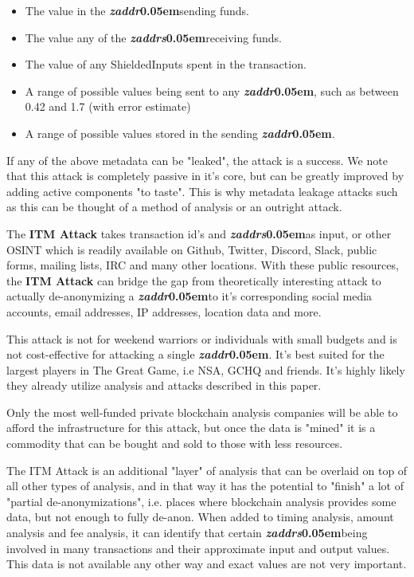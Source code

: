 \documentclass{article}
\newcommand{\term}[1]{\textsl{#1}\kern 0.05em\xspace}
\newcommand{\zaddr}{\textbf{\term{zaddr}}}
\newcommand{\zaddrs}{\textbf{\term{zaddrs}}}
\begin{document}
\begin{itemize}
\item  The value in the \zaddr sending funds.
\item  The value any of the \zaddrs receiving funds.
\item  The value of any ShieldedInputs spent in the transaction.
\item  A range of possible values being sent to any \zaddr, such as between 0.42 and 1.7 (with error estimate)
\item  A range of possible values stored in the sending \zaddr.
\end{itemize}

If any of the above metadata can be "leaked", the attack is a success. We note
that this attack is completely passive in it's core, but can be greatly improved
by adding active components "to taste". This is why metadata leakage attacks such
as this can be thought of a method of analysis or an outright attack.

The \textbf{ITM Attack} takes transaction id's and \zaddrs as input, or other OSINT which is readily available on Github, Twitter, Discord, Slack, public forms, mailing lists, IRC and many other locations. With these public resources, the \textbf{ITM Attack} can bridge the gap from theoretically interesting attack to actually de-anonymizing a \zaddr to it's corresponding social media accounts, email addresses, IP addresses, location data and more.

This attack is not for weekend warriors or individuals with small budgets and is not
cost-effective for attacking a single \zaddr. It's best suited for the largest
players in The Great Game, i.e NSA, GCHQ and friends. It's highly likely they already
utilize analysis and attacks described in this paper.

Only the most well-funded private
blockchain analysis companies will be able to afford the infrastructure for this
attack, but once the data is "mined" it is a commodity that can be bought and sold
to those with less resources.

The ITM Attack is an additional "layer" of analysis that can be overlaid on top of all other
types of analysis, and in that way it has the potential to "finish" a lot of "partial
de-anonymizations", i.e. places where blockchain analysis provides some data, but not
enough to fully de-anon. When added to timing analysis, amount analysis and fee analysis,
it can identify that certain \zaddrs being involved in many transactions and their
approximate input and output values. This data is not available any other way and
exact values are not very important.
\end{document}

